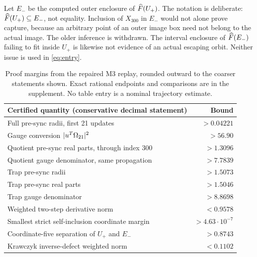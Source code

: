 \documentclass[11pt,a4paper]{article}
\begin{document}
Let $E_-$ be the computed outer enclosure of $\widehat F(U_+)$. The notation is deliberate: $\widehat F(U_+)\subseteq E_-$, not equality. Inclusion of $X_{300}$ in $E_-$ would not alone prove capture, because an arbitrary point of an outer image box need not belong to the actual image. The older inference is withdrawn. The interval enclosure of $\widehat F(E_-)$ failing to fit inside $U_+$ is likewise not evidence of an actual escaping orbit. Neither issue is used in \eqref{eq:entry}.

\begin{table}[htbp]\centering\small
\begin{tabular}{p{.63\linewidth}r}\toprule
Certified quantity (conservative decimal statement) & Bound\\\midrule
Full pre-sync radii, first 21 updates & $>0.04221$\\
Gauge conversion $|u^T\Omega_{21}|^2$ & $>56.90$\\
Quotient pre-sync real parts, through index 300 & $>1.3096$\\
Quotient gauge denominator, same propagation & $>7.7839$\\
Trap pre-sync radii & $>1.5073$\\
Trap pre-sync real parts & $>1.5046$\\
Trap gauge denominator & $>8.8698$\\
Weighted two-step derivative norm & $<0.9578$\\
Smallest strict self-inclusion coordinate margin & $>4.63\cdot10^{-7}$\\
Coordinate-five separation of $U_+$ and $E_-$ & $>0.8743$\\
Krawczyk inverse-defect weighted norm & $<0.1102$\\\bottomrule
\end{tabular}
\caption{Proof margins from the repaired M3 replay, rounded outward to the coarser statements shown. Exact rational endpoints and comparisons are in the supplement. No table entry is a nominal trajectory estimate.}
\label{tab:bounds}\end{table}
\end{document}

